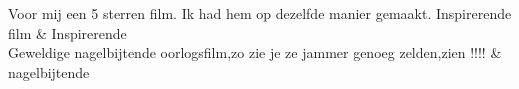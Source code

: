 \begin{table}[h]
\begin{tabu}
Voor mij een 5 sterren film. Ik had hem op dezelfde manier gemaakt. Inspirerende film                                                                                                                                                                                                                                                                                                                                                                                                                                                                                                                                                                                                                                                                                                                                                                                                                                                                                                                                                                                                                                                                                                                                                                                                                                                                                                                                                                                                           & Inspirerende                         \\ \hline
Geweldige nagelbijtende oorlogsfilm,zo zie je ze jammer genoeg zelden,zien !!!!                                                                                                                                                                                                                                                                                                                                                                                                                                                                                                                                                                                                                                                                                                                                                                                                                                                                                                                                                                                                                                                                                                                                                                                                                                                                                                                                                                                                                 & nagelbijtende                        \\ \hline

\end{tabu}
\end{table}
